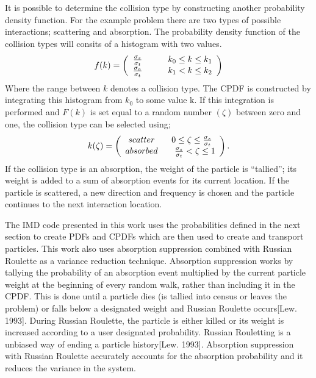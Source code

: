 	It is possible to determine the collision type by constructing another probability density function. For the example problem there are two types of possible interactions; scattering and absorption. The probability density function of the collision types will consits of a histogram with two values.
	\[
	 f(k)=\left(
	 \begin{array}{c c}
	   {\sigma_s\over{\sigma_t}}\hspace{0.25in} & \, k_0\leq k\leq k_1 \\
	   {\sigma_a\over{\sigma_t}}\hspace{0.25in} & \, k_1<k\leq k_2  \\
	 \end{array}
	 \right)
	\]
	Where the range between $k$ denotes a collision type. The CPDF is constructed by integrating this histogram from $k_0$ to some value k. If this integration is performed and $F(k)$ is set equal to a random number $(\zeta)$ between zero and one, the collision type can be selected using;
	\[
	 k(\zeta)=\left(
	 \begin{array}{c  c}
	    scatter\hspace{0.25in} \, 0\leq\zeta\leq{\sigma_s\over{\sigma_t}}\\
	    absorbed\hspace{0.25in} \, {\sigma_s\over{\sigma_t}}<\zeta\leq1\\
	 \end{array}
	 \right).
	\]
	If the collision type is an absorption, the weight of the particle is ``tallied''; its weight is added to a sum of absorption events for its current location. If the particle is scattered, a new direction and frequency is chosen and the particle continues to the next interaction location.

	The IMD code presented in this work uses the probabilities defined in the next section to create PDFs and CPDFs which are then used to create and transport particles. This work also uses absorption suppression combined with Russian Roulette as a variance reduction technique. Absorption suppression works by tallying the probability of an absorption event multiplied by the current particle weight at the beginning of every random walk, rather than including it in the CPDF. This is done until a particle dies (is tallied into census or leaves the problem) or falls below a designated weight and Russian Roulette occurs[Lew. 1993]. During Russian Roulette, the particle is either killed or its weight is increased according to a user designated probability. Russian Rouletting is a unbiased way of ending a particle history[Lew. 1993]. Absorption suppression with Russian Roulette accurately accounts for the absorption probability and it reduces the variance in the system.
			

